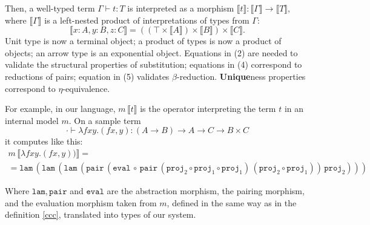 Then, a well-typed term $\Gamma\vdash t:T$ is
interpreted as a morphism $\llbracket t\rrbracket:
\llbracket\Gamma\rrbracket\to\llbracket T\rrbracket$,
where $\llbracket\Gamma\rrbracket$ is a left-nested
product of interpretations of types from $\Gamma$:
\[
    \llbracket x:A,y:B,z:C\rrbracket=
    ((\top\times\llbracket A\rrbracket)
    \times\llbracket B\rrbracket)
    \times\llbracket C\rrbracket.
\]
Unit type is now a terminal object; a product of types is
now a product of objects; an arrow type is an exponential
object. Equations in (2) are needed to validate the
structural properties of substitution; equations in (4)
correspond to reductions of pairs; equation in (5)
validates $\beta$-reduction. \textbf{Unique}ness
properties correspond to $\eta$-equivalence.

For example, in our language, $m\,\llbracket t
\rrbracket$ is the operator interpreting the term $t$ in
an internal model $m$. On a sample term
\[
    \cdot\vdash\lambda f x y. (f x, y):
        (A\to B)\to A\to C\to B\times C
\]
it computes like this:
\begin{multline*}
    m\,\llbracket\lambda f x y. (f x, y))\rrbracket=\\=
    \mathtt{lam}\,(\mathtt{lam}\,(\mathtt{lam}\,(
        \mathtt{pair}\,
            (\mathtt{eval}\,\circ\,\mathtt{pair}\,
                (\mathtt{proj}_2\circ\mathtt{proj}_1
                    \circ\mathtt{proj}_1
                )\,
                (\mathtt{proj}_2\circ\mathtt{proj}_1)
            )\,
            \mathtt{proj}_2
    )))
\end{multline*}

Where $\mathtt{lam}$,\,$\mathtt{pair}$ and
$\mathtt{eval}$ are the abstraction morphism, the
pairing morphism, and the evaluation morphism taken from
$m$, defined in the same way as in the definition
\ref{ccc}, translated into types of our system.

